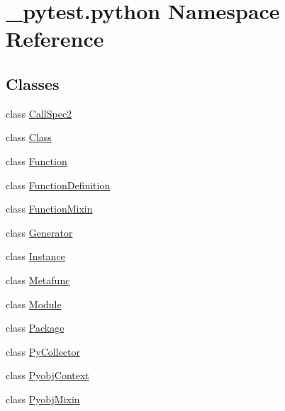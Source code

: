 \hypertarget{namespace__pytest_1_1python}{}\section{\+\_\+pytest.\+python Namespace Reference}
\label{namespace__pytest_1_1python}
\subsection*{Classes}
\begin{DoxyCompactItemize}
\item 
class \hyperlink{class__pytest_1_1python_1_1_call_spec2}{Call\+Spec2}
\item 
class \hyperlink{class__pytest_1_1python_1_1_class}{Class}
\item 
class \hyperlink{class__pytest_1_1python_1_1_function}{Function}
\item 
class \hyperlink{class__pytest_1_1python_1_1_function_definition}{Function\+Definition}
\item 
class \hyperlink{class__pytest_1_1python_1_1_function_mixin}{Function\+Mixin}
\item 
class \hyperlink{class__pytest_1_1python_1_1_generator}{Generator}
\item 
class \hyperlink{class__pytest_1_1python_1_1_instance}{Instance}
\item 
class \hyperlink{class__pytest_1_1python_1_1_metafunc}{Metafunc}
\item 
class \hyperlink{class__pytest_1_1python_1_1_module}{Module}
\item 
class \hyperlink{class__pytest_1_1python_1_1_package}{Package}
\item 
class \hyperlink{class__pytest_1_1python_1_1_py_collector}{Py\+Collector}
\item 
class \hyperlink{class__pytest_1_1python_1_1_pyobj_context}{Pyobj\+Context}
\item 
class \hyperlink{class__pytest_1_1python_1_1_pyobj_mixin}{Pyobj\+Mixin}
\end{DoxyCompactItemize}
